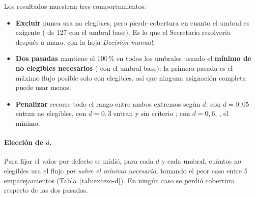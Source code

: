 \documentclass{article}
\begin{document}
\begin{table}[H]
\centering
\small

\caption{Todos los modos con el umbral base (\elegPromMin{} / \elegNotaMin).}
\label{tab:no-elegibles}
\end{table}

\begin{table}[H]
\centering
\small
\resizebox{\textwidth}{!}{}
\caption{Efecto del umbral: unidades cubiertas al excluir, y no elegibles que usan las dos pasadas y el peso $d = 0{,}6$.}
\label{tab:umbrales}
\end{table}

Los resultados muestran tres comportamientos:
\begin{itemize}
    \item \textbf{Excluir} nunca usa no elegibles, pero pierde cobertura en cuanto el umbral es exigente (\neExcluirCub{} de 127 con el umbral base). Es lo que el Secretario resolvería después a mano, con la hoja \emph{Decisión manual}.
    \item \textbf{Dos pasadas} mantiene el 100\,\% en todos los umbrales usando el \textbf{mínimo de no elegibles necesarios} (\neDosNo{} con el umbral base): la primera pasada es el máximo flujo posible solo con elegibles, así que ninguna asignación completa puede usar menos.
    \item \textbf{Penalizar} recorre todo el rango entre ambos extremos según $d$: con $d = 0{,}05$ entran \nePenChicoNo{} no elegibles, con $d = 0{,}3$ entran \nePenMedioNo{} y sin criterio \neSinCritNo; con $d = 0{,}6$, \nePenGrandeNo, el mínimo.
\end{itemize}

\paragraph{Elección de $d$.} Para fijar el valor por defecto se midió, para cada $d$ y cada umbral, cuántos no elegibles usa el flujo \emph{por sobre el mínimo necesario}, tomando el peor caso entre 5 emparejamientos (Tabla~\ref{tab:exceso-d}). En ningún caso se perdió cobertura respecto de las dos pasadas.

\begin{table}[H]
\centering
\small

\caption{No elegibles asignados por sobre el mínimo necesario, peor caso en 5 emparejamientos, por valor de $d$ (filas) y umbral promedio / nota (columnas). 0 significa que no se usaron no elegibles adicionales a los necesarios para alcanzar la cobertura obtenida, considerando conjuntamente todas las restricciones.}
\label{tab:exceso-d}
\end{table}
\end{document}
